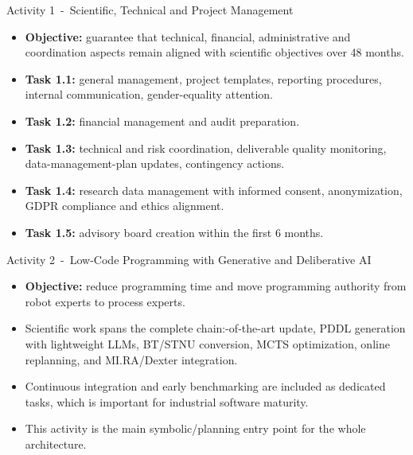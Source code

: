 \documentclass[aspectratio=169,10pt]{beamer}
\begin{document}
\begin{frame}{Activity 1~-~Scientific, Technical and Project Management}

\small
\begin{itemize}
  \item \textbf{Objective:} guarantee that technical, financial, administrative and coordination aspects remain aligned with scientific objectives over 48 months.
  \item \textbf{Task 1.1:} general management, project templates, reporting procedures, internal communication, gender-equality attention.
  \item \textbf{Task 1.2:} financial management and audit preparation.
  \item \textbf{Task 1.3:} technical and risk coordination, deliverable quality monitoring, data-management-plan updates, contingency actions.
  \item \textbf{Task 1.4:} research data management with informed consent, anonymization, GDPR compliance and ethics alignment.
  \item \textbf{Task 1.5:} advisory board creation within the first 6 months.
\end{itemize}

\end{frame}


\begin{frame}{Activity 2~-~Low-Code Programming with Generative and Deliberative AI}

\small
\begin{itemize}
  \item \textbf{Objective:} reduce programming time and move programming authority from robot experts to process experts.
  \item Scientific work spans the complete chain:\@state-of-the-art update, PDDL generation with lightweight LLMs, BT/STNU conversion, MCTS optimization, online replanning, and MI.RA/Dexter integration.
  \item Continuous integration and early benchmarking are included as dedicated tasks, which is important for industrial software maturity.
  \item This activity is the main symbolic/planning entry point for the whole architecture.
\end{itemize}

\end{frame}
\end{document}
